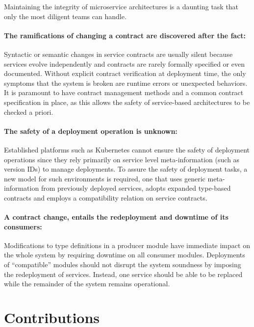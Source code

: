 Maintaining the integrity of microservice architectures is a daunting task that only the most diligent teams can handle.

\paragraph{The ramifications of changing a contract are discovered after the fact:}

Syntactic or semantic changes in service contracts are usually silent because services evolve independently and contracts are rarely formally specified or even documented.
Without explicit contract verification at deployment time, the only symptoms that the system is broken are runtime errors or unexpected behaviors.
It is paramount to have contract management methods and a common contract specification in place, as this allows the safety of service-based architectures to be checked a priori.

\paragraph{The safety of a deployment operation is unknown:}

Established platforms such as Kubernetes cannot ensure the safety of deployment operations since they rely primarily on service level meta-information (such as version IDs) to manage deployments.
To assure the safety of deployment tasks, a new model for such environments is required,
one that uses generic meta-information from previously deployed services, adopts expanded type-based contracts and employs a compatibility relation on service contracts.

\paragraph{A contract change, entails the redeployment and downtime of its consumers:}

Modifications to type definitions in a producer module have immediate
impact on the whole system by requiring downtime on all consumer modules.
Deployments of “compatible” modules should not disrupt the system soundness by imposing the redeployment of services.
Instead, one service should be able to be replaced while the remainder of the system remains operational.

\section{Contributions} %
\label{sec:contributions}

